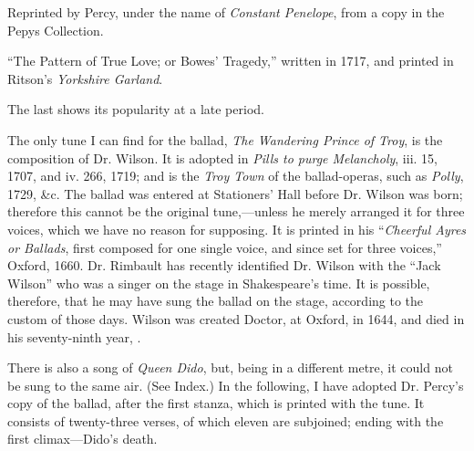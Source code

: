Reprinted by Percy, under the name of \textit{Constant Penelope}, from a copy in the
Pepys Collection.

“The Pattern of True Love; or Bowes’ Tragedy,” written in 1717, and printed
in Ritson’s \textit{Yorkshire Garland}.

The last shows its popularity at a late period.

The only tune I can find for the ballad, \textit{The Wandering Prince of Troy}, is the
composition of Dr. Wilson. It is adopted in \textit{ Pills to purge Melancholy}, iii. 15,
1707, and iv. 266, 1719; and is the \textit{Troy Town} of the ballad-operas, such as
\textit{Polly}, 1729, \&c. The ballad was entered at Stationers’ Hall before Dr. Wilson
was born; therefore this cannot be the original tune,—unless he merely arranged
it for three voices, which we have no reason for supposing. It is printed in his
“\textit{Cheerful Ayres or Ballads}, first composed for one single voice, and since set
for three voices,” Oxford, 1660. Dr. Rimbault has recently identified Dr.
Wilson with the “Jack Wilson” who was a singer on the stage in Shakespeare’s
time. It is possible, therefore, that he may have sung the ballad on the stage,
according to the custom of those days. Wilson was created Doctor, at Oxford,
in 1644, and died in his seventy-ninth year, .

There is also a song of \textit{Queen Dido}, but, being in a different metre, it could
not be sung to the same air. (See Index.) In the following, I have adopted
Dr. Percy’s copy of the ballad, after the first stanza, which is printed with the
tune. It consists of twenty-three verses, of which eleven are subjoined; ending
with the first climax—Dido’s death.



\pagebreak%

